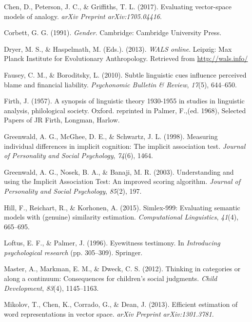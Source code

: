 \documentclass[10pt, letterpaper]{article}
\begin{document}
\hypertarget{ref-chen2017evaluating}{}
Chen, D., Peterson, J. C., \& Griffiths, T. L. (2017). Evaluating
vector-space models of analogy. \emph{arXiv Preprint arXiv:1705.04416}.

\hypertarget{ref-corbett1991}{}
Corbett, G. G. (1991). \emph{Gender}. Cambridge: Cambridge University
Press.

\hypertarget{ref-wals}{}
Dryer, M. S., \& Haspelmath, M. (Eds.). (2013). \emph{WALS online}.
Leipzig: Max Planck Institute for Evolutionary Anthropology. Retrieved
from \url{http://wals.info/}

\hypertarget{ref-fausey2010subtle}{}
Fausey, C. M., \& Boroditsky, L. (2010). Subtle linguistic cues
influence perceived blame and financial liability. \emph{Psychonomic
Bulletin \& Review}, \emph{17}(5), 644--650.

\hypertarget{ref-firth1957synopsis}{}
Firth, J. (1957). A synopsis of linguistic theory 1930-1955 in studies
in linguistic analysis, philological society. Oxford. reprinted in
Palmer, F.,(ed. 1968), Selected Papers of JR Firth, Longman, Harlow.

\hypertarget{ref-greenwald1998measuring}{}
Greenwald, A. G., McGhee, D. E., \& Schwartz, J. L. (1998). Measuring
individual differences in implicit cognition: The implicit association
test. \emph{Journal of Personality and Social Psychology}, \emph{74}(6),
1464.

\hypertarget{ref-greenwald2003understanding}{}
Greenwald, A. G., Nosek, B. A., \& Banaji, M. R. (2003). Understanding
and using the Implicit Association Test: An improved scoring algorithm.
\emph{Journal of Personality and Social Psychology}, \emph{85}(2), 197.

\hypertarget{ref-hill2015simlex}{}
Hill, F., Reichart, R., \& Korhonen, A. (2015). Simlex-999: Evaluating
semantic models with (genuine) similarity estimation.
\emph{Computational Linguistics}, \emph{41}(4), 665--695.

\hypertarget{ref-loftus1996eyewitness}{}
Loftus, E. F., \& Palmer, J. (1996). Eyewitness testimony. In
\emph{Introducing psychological research} (pp. 305--309). Springer.

\hypertarget{ref-master2012thinking}{}
Master, A., Markman, E. M., \& Dweck, C. S. (2012). Thinking in
categories or along a continuum: Consequences for children's social
judgments. \emph{Child Development}, \emph{83}(4), 1145--1163.

\hypertarget{ref-mikolov2013efficient}{}
Mikolov, T., Chen, K., Corrado, G., \& Dean, J. (2013). Efficient
estimation of word representations in vector space. \emph{arXiv Preprint
arXiv:1301.3781}.
\end{document}
